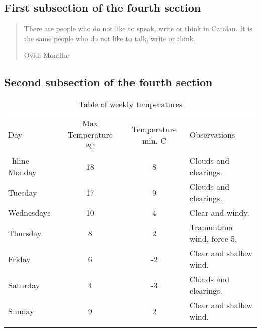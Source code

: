 \documentclass[a4paper,
                             twoside,
                             BCOR1.0cm,
                             DIV11,
                             parskip=full,
                             11pt]{scrbook}
\let\shline\hline
\def\hline{\noalign{\vskip3pt}\shline\noalign{\vskip4pt}}
\begin{document}
\subsection{First subsection of the fourth section}\label{sbsec:first}
\lipsum[1-3]
\begin{quote}
There are people who do not like to speak, write or think in Catalan. It is the same people who do not like to talk, write or think.

Ovidi Montllor
\end{quote}
\subsection{Second subsection of the fourth section}\label{sbsec:second}
\lipsum[4-5]
\begin{table}[h]
\centering\scriptsize
\begin{tabular}{l|c|c|l}
\hline
Day & Max Temperature ºC & Temperature min. C & Observations \\
\ hline
Monday & 18 & 8 & Clouds and clearings. \\
Tuesday & 17 & 9 & Clouds and clearings. \\
Wednesdays & 10 & 4 & Clear and windy. \\
Thursday & 8 & 2 & Tramuntana wind, force 5. \\
Friday & 6 & -2 & Clear and shallow wind. \\
Saturday & 4 & -3 & Clouds and clearings. \\
Sunday & 9 & 2 & Clear and shallow wind. \\
\hline
\end{tabular}
\caption{Table of weekly temperatures}\label{tab:temp2}
\end{table}
\lipsum[8-9]
\end{document}
